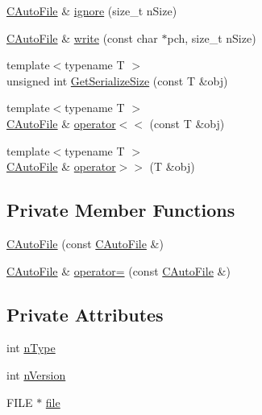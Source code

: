 \begin{DoxyCompactItemize}
\item 
\mbox{\hyperlink{class_c_auto_file}{C\+Auto\+File}} \& \mbox{\hyperlink{class_c_auto_file_a0159b896d7ed2574cc32663987bfc0ce}{ignore}} (size\+\_\+t n\+Size)
\item 
\mbox{\hyperlink{class_c_auto_file}{C\+Auto\+File}} \& \mbox{\hyperlink{class_c_auto_file_a7b2852b345b75835f883be3732cf826a}{write}} (const char $\ast$pch, size\+\_\+t n\+Size)
\item 
{\footnotesize template$<$typename T $>$ }\\unsigned int \mbox{\hyperlink{class_c_auto_file_a883a261f0d7d0320f72152ff2167fd24}{Get\+Serialize\+Size}} (const T \&obj)
\item 
{\footnotesize template$<$typename T $>$ }\\\mbox{\hyperlink{class_c_auto_file}{C\+Auto\+File}} \& \mbox{\hyperlink{class_c_auto_file_a8e194596d1f8f64059247724b25df82c}{operator$<$$<$}} (const T \&obj)
\item 
{\footnotesize template$<$typename T $>$ }\\\mbox{\hyperlink{class_c_auto_file}{C\+Auto\+File}} \& \mbox{\hyperlink{class_c_auto_file_ae6826219322626d2ac8229e022c41dd7}{operator$>$$>$}} (T \&obj)
\end{DoxyCompactItemize}
\subsection*{Private Member Functions}
\begin{DoxyCompactItemize}
\item 
\mbox{\hyperlink{class_c_auto_file_a2d7c38154632735962c24d472c01608c}{C\+Auto\+File}} (const \mbox{\hyperlink{class_c_auto_file}{C\+Auto\+File}} \&)
\item 
\mbox{\hyperlink{class_c_auto_file}{C\+Auto\+File}} \& \mbox{\hyperlink{class_c_auto_file_a5937561da10e79c2da4bb47c0fc57d96}{operator=}} (const \mbox{\hyperlink{class_c_auto_file}{C\+Auto\+File}} \&)
\end{DoxyCompactItemize}
\subsection*{Private Attributes}
\begin{DoxyCompactItemize}
\item 
int \mbox{\hyperlink{class_c_auto_file_a39ca705ff45e36a05acd5df3c4114aef}{n\+Type}}
\item 
int \mbox{\hyperlink{class_c_auto_file_a23fb456ee23003aebc3c58ab3fd683c1}{n\+Version}}
\item 
F\+I\+LE $\ast$ \mbox{\hyperlink{class_c_auto_file_a04ae666616ebc5d873c636fe6d2998ff}{file}}
\end{DoxyCompactItemize}


